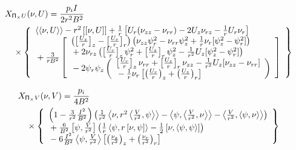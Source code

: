 \documentclass[letterpaper]{book}
\newcommand{\tensor}[1]{\mathsf{#1}}
\renewcommand{\P}{\tensor{\Pi}}
\newcommand{\pb}[2]{\left[#1,#2\right]}
\newcommand{\ip}[2]{\left\langle  #1,#2\right\rangle}
\newcommand{\funcss}[2]{
  \left\langle\left\langle #1,#2 \right\rangle\right\rangle}
\newcommand{\funcaa}[2]{\left[\left[ #1,#2 \right]\right]}
\begin{document}
\begin{eqnarray*}
  & \lefteqn{X_{\P_\times U}(\nu, U) = \frac{p_i I}{2 r^2 B^2}} &
  \\ && \mbox{} \times  
  \left\{ \begin{array}{l}
  \funcss{\nu}{U} - r^2 \funcaa{\nu}{U} 
  + \frac{1}{r} \left[ U_r (\nu_{z z} - \nu_{r r})
                     -2 U_z \nu_{r z} - \frac{1}{r} U_r \nu_r \right]
  \\ \mbox{}
  + \frac{3}{r B^2} \left[ \begin{array}{l}
    \left( \left[\frac{U_z}{r} \right]_z 
         - \left[\frac{U_r}{r} \right]_r \right)
    \left(\nu_{z z} \psi_r^2 - \nu_{r r} \psi_z^2
         +\frac{1}{r} \nu_r [\psi_z^2 - \psi_r^2] \right)
    \\ \mbox{}
    + 2\nu_{r z} \left( 
        \left[ \frac{U_r}{r} \right]_z \psi_r^2
      + \left[ \frac{U_z}{r} \right]_r \psi_z^2
      - \frac{1}{r^2} U_z [\psi_z^2 - \psi_r^2] \right)
    \\ \mbox{}
    - 2 \psi_r \psi_z \left( \begin{array}{l}
        \left[ \frac{U_r}{r} \right]_z \nu_{r r}
      + \left[ \frac{U_z}{r} \right]_r \nu_{z z}
      - \frac{1}{r^2} U_z [\nu_{z z} - \nu_{r r}] 
      \\ \mbox{}
      - \frac{1}{r} \nu_r \left[ 
	  \left( \frac{U_r}{r} \right)_z
	+ \left( \frac{U_z}{r} \right)_r \right] 
      \end{array} \right)
    \end{array} \right]
  \end{array} \right\}
\end{eqnarray*}

\begin{eqnarray*}
  & \lefteqn{X_{\P_\times V}(\nu, V) = \frac{p_i}{4 B^2}} &
  \\ && \mbox{} \times 
  \left\{ \begin{array}{l}
    \left(1 - \frac{3}{r^2} \frac{I^2}{B^2} \right) \left(
    \frac{1}{r^2} \ip{\nu}{r^2\ip{\frac{V}{r^2}}{\psi}}
    - \ip{\psi}{\ip{\frac{V}{r^2}}{\nu}}
    - \ip{\frac{V}{r^2}}{\ip{\psi}{\nu}} \right)
    \\ \mbox{} + \frac{6}{B^2} \pb{\psi}{\frac{V}{r^2}}
    \left(\frac{1}{r} \ip{\psi}{r \pb{\nu}{\psi}}
    - \frac{1}{2} \pb{\nu}{\ip{\psi}{\psi}} \right)
    \\ \mbox{} - 6 \frac{I^2}{B^2} \ip{\psi}{\frac{V}{r^2}}
    \left[ \left(\frac{\nu_z}{r^2} \right)_z
         + \left(\frac{\nu_r}{r^2} \right)_r \right]
  \end{array} \right\}
\end{eqnarray*}
\end{document}
